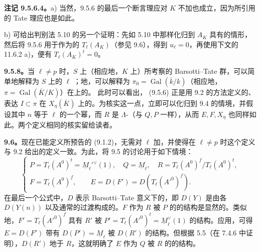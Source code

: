 \textbf{注记 9.5.6.4。}a) 当然，9.5.6 的最后一个断言理应对 $K$ 不加也成立，因为所引用的 Tate 理应也是如此。

b) 可给出判别法 5.10 的另一个证明：先如 5.10 中那样化归到 $A_K$ 具有的情形，然后将 9.5.6 用于作为的 $T_\ell(A_K)$（参见 9.6），得到 $u_\ell=0$，再使用下文的 11.6.2 a)，便有 $T_\ell(A_K)^t=0$。

\textbf{9.5.8。}当 $\ell\ne p$ 时，$S$ 上（相应地，$K$ 上）所考察的 Barsotti--Tate 群，可以简单地解释为 $S$ 上的 $\ell$ ；地，可以解释为 $\pi_0=\operatorname{Gal}(\overline k/k)$（相应地，$\pi=\operatorname{Gal}(\overline K/K)$）在上的。
此时可以看出， (9.5.6) 正是用 9.2 的方法定义的、表达 $I\subset\pi$ 在 $X_\eta(\overline K)$ 上的。为核实这一点，立即可以化归到 9.4 的情境，并假设其中 $n$ 等于 $\ell$ 的一个幂，而 $R$ 是 $\Lambda$-（与 $Q,P$ 一样），从而 $E,F,X_\eta$ 也同样如此。两个定义相同的核实留给读者。

\textbf{9.6。}现在已能定义所预告的 (9.1.2)，无需对 $\ell$ 加，并使得在 $\ell\ne p$ 时这个定义与 9.2 给出的定义一致。为此，将 9.5 的讨论用于如下情境：
\begin{equation}\tag{9.6.1}
 \begin{cases}
 P=T_\ell(A^0)^t=\underline M_\ell'{}^\vee(1),
 \quad Q=\underline M_\ell,
 \quad R=T_\ell(A^0)^f/T_\ell(A^0)^t,\\[4pt]
 F=T_\ell(A^0)^f,\qquad E=D(F')=D(T_\ell(A'^0)^f).
 \end{cases}
\end{equation}
在最后一个公式中，$D$ 表示 Barsotti--Tate 意义下的，即 $D(Y)$ 是由各 $D(Y(n))$ 以及通常的过渡构成的。$F$ 作为 $R$ 被 $P$ 的的结构是显然的。类似地，$F'=T_\ell(A'^0)^f$ 具有 $R'$ 被 $P'=T_\ell(A'^0)^t=\underline M_\ell^\vee(1)$ 的结构。应用，可得 $E=D(F')$ 带有 $D(P')=\underline M_\ell$ 被 $D(R')$ 的结构。但根据 5.5（在 7.4.6 中证明），$D(R')$ 地于 $R$，这就明确了 $E$ 作为 $Q$ 被 $R$ 的的结构。

